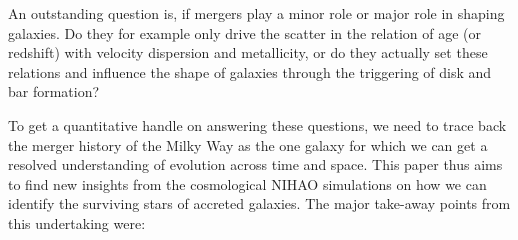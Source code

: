 \documentclass[fleqn,usenatbib]{mnras}
\begin{document}
An outstanding question is, if mergers play a minor role or major role in shaping galaxies. Do they for example only drive the scatter in the relation of age (or redshift) with velocity dispersion and metallicity, or do they actually set these relations and influence the shape of galaxies through the triggering of disk and bar formation?

To get a quantitative handle on answering these questions, we need to trace back the merger history of the Milky Way as the one galaxy for which we can get a resolved understanding of evolution across time and space. This paper thus aims to find new insights from the cosmological \textsc{NIHAO} simulations on how we can identify the surviving stars of accreted galaxies. The major take-away points from this undertaking were:

\end{document}
